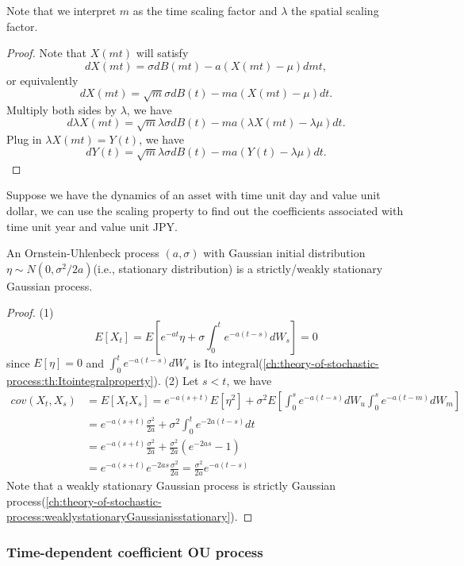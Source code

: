 \begin{refsection}
\begin{lemma}
	Note that we interpret $m$ as the time scaling factor and $\lambda$ the spatial scaling factor.	
\end{lemma}
\begin{proof}
	Note that $X(mt)$ will satisfy
	$$dX(mt) = \sigma dB(mt) - a(X(mt) - \mu) dmt,$$
	or equivalently
	$$dX(mt) = \sqrt{m}\sigma dB(t) - ma(X(mt) - \mu) dt.$$
	Multiply both sides by $\lambda$, we have
	$$d\lambda X(mt) = \sqrt{m}\lambda \sigma dB(t) - ma(\lambda X(mt) - \lambda \mu) dt.$$
	Plug in $\lambda X(mt) = Y(t)$, we have
	$$dY(t) = \sqrt{m}\lambda\sigma dB(t) - ma(Y(t) - \lambda\mu) dt.$$
\end{proof}

\begin{remark}
	Suppose we have the dynamics of an asset with time unit day and value unit dollar, we can use the scaling property to find out the coefficients associated with time unit year and value unit JPY.
\end{remark}	

\begin{lemma}
	An Ornstein-Uhlenbeck process $(a,\sigma)$ with Gaussian initial distribution $\eta \sim N(0, \sigma^2/2a)$(i.e., stationary distribution) is a strictly/weakly stationary Gaussian process.
\end{lemma}
\begin{proof}
	(1)$$E[X_t] = E[e^{-at}\eta + \sigma \int_0^t e^{-a(t-s)}dW_s] = 0$$
	since $E[\eta] = 0$ and $\int_0^t e^{-a(t-s)}dW_s$ is Ito integral(\autoref{ch:theory-of-stochastic-process:th:Itointegralproperty}).
	(2) Let $s < t$, we have
	\begin{align*}
	cov(X_t,X_s) &= E[X_tX_s] = e^{-a(s+t)}E[\eta^2] + \sigma^2E[\int_0^s e^{-a(t-s)}dW_u\int_0^s e^{-a(t-m)}dW_m]\\
	&=e^{-a(s+t)}\frac{\sigma^2}{2a} + \sigma^2\int_0^t e^{-2a(t-s)}dt\\
	&=e^{-a(s+t)}\frac{\sigma^2}{2a} + \frac{\sigma^2}{2a}(e^{-2as} - 1) \\
	&=e^{-a(s+t)}e^{-2as} \frac{\sigma^2}{2a}= \frac{\sigma^2}{2a}e^{-a(t-s)}
	\end{align*}
	Note that a weakly stationary Gaussian process is strictly Gaussian process(\autoref{ch:theory-of-stochastic-process:weaklystationaryGaussianisstationary}).
\end{proof}

\subsubsection{Time-dependent coefficient OU process}


\end{refsection}
